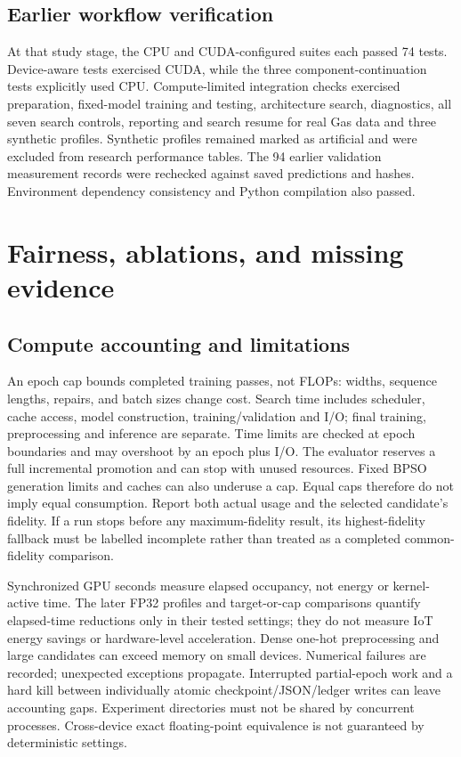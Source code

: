 \documentclass[11pt,a4paper]{report}
\begin{document}



\section{Earlier workflow verification}
At that study stage, the CPU and CUDA-configured suites each passed 74 tests. Device-aware tests exercised CUDA, while the three component-continuation tests explicitly used CPU. Compute-limited integration checks exercised preparation, fixed-model training and testing, architecture search, diagnostics, all seven search controls, reporting and search resume for real Gas data and three synthetic profiles. Synthetic profiles remained marked as artificial and were excluded from research performance tables. The 94 earlier validation measurement records were rechecked against saved predictions and hashes. Environment dependency consistency and Python compilation also passed.



\chapter{Fairness, ablations, and missing evidence}
\section{Compute accounting and limitations}
An epoch cap bounds completed training passes, not FLOPs: widths, sequence lengths, repairs, and batch sizes change cost. Search time includes scheduler, cache access, model construction, training/validation and I/O; final training, preprocessing and inference are separate. Time limits are checked at epoch boundaries and may overshoot by an epoch plus I/O. The evaluator reserves a full incremental promotion and can stop with unused resources. Fixed BPSO generation limits and caches can also underuse a cap. Equal caps therefore do not imply equal consumption. Report both actual usage and the selected candidate's fidelity. If a run stops before any maximum-fidelity result, its highest-fidelity fallback must be labelled incomplete rather than treated as a completed common-fidelity comparison.

Synchronized GPU seconds measure elapsed occupancy, not energy or kernel-active time. The later FP32 profiles and target-or-cap comparisons quantify elapsed-time reductions only in their tested settings; they do not measure IoT energy savings or hardware-level acceleration. Dense one-hot preprocessing and large candidates can exceed memory on small devices. Numerical failures are recorded; unexpected exceptions propagate. Interrupted partial-epoch work and a hard kill between individually atomic checkpoint/JSON/ledger writes can leave accounting gaps. Experiment directories must not be shared by concurrent processes. Cross-device exact floating-point equivalence is not guaranteed by deterministic settings.
\end{document}
